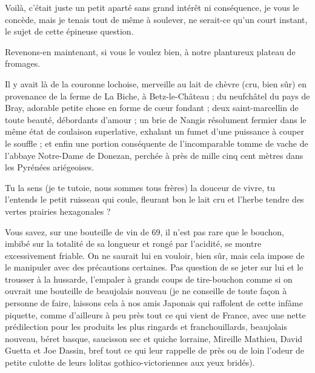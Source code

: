 Voilà, c’était juste un petit aparté sans grand intérêt ni conséquence, je vous le concède, mais je tenais tout de même à soulever, ne serait-ce qu’un court instant, le sujet de cette épineuse question.

Revenons-en maintenant, si vous le voulez bien, à notre plantureux plateau de fromages.

Il y avait là de la couronne lochoise, merveille au lait de chèvre (cru, bien sûr) en provenance de la ferme de La Biche, à Betz-le-Château ; du neufchâtel du pays de Bray, adorable petite chose en forme de cœur fondant ; deux saint-marcellin de toute beauté, débordants d’amour ; un brie de Nangis résolument fermier dans le même état de coulaison superlative, exhalant un fumet d’une puissance à couper le souffle ; et enfin une portion conséquente de l’incomparable tomme de vache de l’abbaye Notre-Dame de Donezan, perchée à près de mille cinq cent mètres dans les Pyrénées ariégeoises.

Tu la sens (je te tutoie, nous sommes tous frères) la douceur de vivre, tu l’entends le petit ruisseau qui coule, fleurant bon le lait cru et l’herbe tendre des vertes prairies hexagonales ?

Vous savez, sur une bouteille de vin de 69, il n’est pas rare que le bouchon, imbibé sur la totalité de sa longueur et rongé par l’acidité, se montre excessivement friable. On ne saurait lui en vouloir, bien sûr, mais cela impose de le manipuler avec des précautions certaines. Pas question de se jeter sur lui et le trousser à la hussarde, l’empaler à grands coups de tire-bouchon comme si on ouvrait une bouteille de beaujolais nouveau (je ne conseille de toute façon à personne de faire, laissons cela à nos amis Japonais qui raffolent de cette infâme piquette, comme d’ailleurs à peu près tout ce qui vient de France, avec une nette prédilection pour les produits les plus ringards et franchouillards, beaujolais nouveau, béret basque, saucisson sec et quiche lorraine, Mireille Mathieu, David Guetta et Joe Dassin, bref tout ce qui leur rappelle de près ou de loin l’odeur de petite culotte de leurs lolitas gothico-victoriennes aux yeux bridés).

